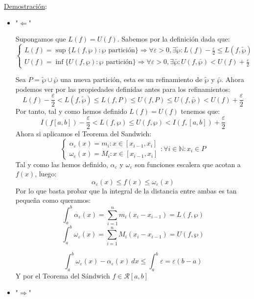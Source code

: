 \documentclass[10pt,a4paper,openright]{book}
\begin{document}
\underline{Demostración}:

\begin{itemize}
\item "$\Leftarrow$"

Supongamos que $L(f)=U(f)$. Sabemos por la definición dada que:
$$\begin{cases} L(f) = \sup\{L(f, \wp) : \wp \mbox{ partición}\} \Rightarrow\forall \varepsilon > 0, \exists \tilde{\wp} : L(f) - \frac{\varepsilon}{2} \leq L(f,\tilde{\wp}) \\ U(f) = \inf\{U(f, \wp) : \wp \mbox{ partición}\}\Rightarrow \forall \varepsilon > 0, \exists \bar{\wp}: U(f, \bar{\wp}) < U(f) +\frac{\varepsilon}{2}\end{cases}$$

Sea $P = \tilde{\wp} \cup \bar{\wp}$ una nueva partición, esta es un refinamiento de $\tilde{\wp}$ y $\bar{\wp}$. Ahora podemos ver por las propiedades definidas antes para los refinamientos:
$$L(f) - \frac{\varepsilon}{2} < L(f, \tilde{\wp}) \leq L(f,P) \leq U(f,P) \leq U(f, \bar{\wp}) < U(f) + \frac{\varepsilon}{2} $$
Por tanto, tal y como hemos definido $L(f)=U(f)$ tenemos que:
$$I(f [a,b]) - \frac{\varepsilon}{2} < L(f,\wp) \leq U(f,\wp) < I(f, [a,b]) + \frac{\varepsilon}{2}$$
Ahora si aplicamos el Teorema del Sandwich:
$$\begin{cases} \alpha_\varepsilon (x) = m_i:x\in [x_{i-1}, x_i] \\ \omega_\varepsilon (x) = M_i:x\in [x_{i-1}, x_i] \end{cases}: \forall i \in \mathbb N: x_i\in P$$
Tal y como las hemos definido, $\alpha_\varepsilon$ y $\omega_\varepsilon$ son funciones escalera que acotan a $f(x)$, luego:
$$\alpha_\varepsilon (x) \leq f(x) \leq \omega_\varepsilon (x)$$
Por lo que basta probar que la integral de la distancia entre ambas es tan pequeña como queramos:
$$\int_{a}^{b} \alpha_\varepsilon (x) = \sum_{i=1}^{n} m_i (x_i - x_{i-1}) = L(f, \wp)$$
$$\int_{a}^{b} \omega_\varepsilon (x) = \sum_{i=1}^{n} M_i (x_i - x_{i-1}) = U(f, \wp)$$

$$\int_{a}^{b} \omega_\varepsilon (x) - \alpha_\varepsilon (x)\ dx \leq \int_{a}^{b} \varepsilon = \varepsilon (b-a)$$
Y por el Teorema del Sándwich $f\in \mathcal{R}[a,b]$

\item "$\Rightarrow$"


\end{itemize}
\end{document}
